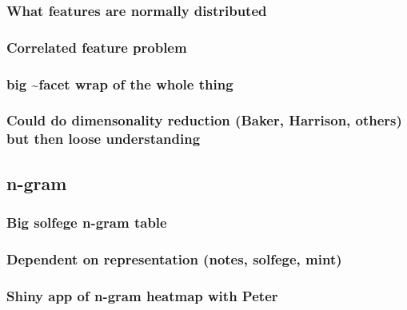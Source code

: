 \documentclass[]{book}
\begin{document}
\hypertarget{what-features-are-normally-distributed}{%
\subsubsection{What features are normally distributed}\label{what-features-are-normally-distributed}}

\hypertarget{correlated-feature-problem}{%
\subsubsection{Correlated feature problem}\label{correlated-feature-problem}}

\hypertarget{big-facet-wrap-of-the-whole-thing}{%
\subsubsection{big \textasciitilde{}facet wrap of the whole thing}\label{big-facet-wrap-of-the-whole-thing}}

\hypertarget{could-do-dimensonality-reduction-baker-harrison-others-but-then-loose-understanding}{%
\subsubsection{Could do dimensonality reduction (Baker, Harrison, others) but then loose understanding}\label{could-do-dimensonality-reduction-baker-harrison-others-but-then-loose-understanding}}

\hypertarget{n-gram}{%
\subsection{n-gram}\label{n-gram}}

\hypertarget{big-solfege-n-gram-table}{%
\subsubsection{Big solfege n-gram table}\label{big-solfege-n-gram-table}}

\hypertarget{dependent-on-representation-notes-solfege-mint}{%
\subsubsection{Dependent on representation (notes, solfege, mint)}\label{dependent-on-representation-notes-solfege-mint}}

\hypertarget{shiny-app-of-n-gram-heatmap-with-peter}{%
\subsubsection{Shiny app of n-gram heatmap with Peter}\label{shiny-app-of-n-gram-heatmap-with-peter}}
\end{document}
